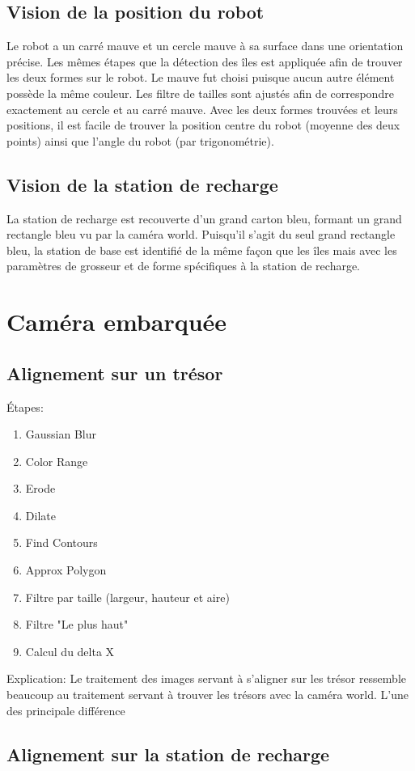 \subsection{Vision de la position du robot}

Le robot a un carré mauve et un cercle mauve à sa surface dans une orientation précise. Les mêmes étapes que la détection des îles est appliquée afin de trouver les deux formes sur le robot. Le mauve fut choisi puisque aucun autre élément possède la même couleur. Les filtre de tailles sont ajustés afin de correspondre exactement au cercle et au carré mauve. Avec les deux formes trouvées et leurs positions, il est facile de trouver la position centre du robot (moyenne des deux points) ainsi que l'angle du robot (par trigonométrie).


\subsection{Vision de la station de recharge}

La station de recharge est recouverte d'un grand carton bleu, formant un grand rectangle bleu vu par la caméra world. Puisqu'il s'agit du seul grand rectangle bleu, la station de base est identifié de la même façon que les îles mais avec les paramètres de grosseur et de forme spécifiques à la station de recharge.

\section{Caméra embarquée}

\subsection{Alignement sur un trésor}

Étapes:
\begin{enumerate}
\item Gaussian Blur
\item Color Range
\item Erode
\item Dilate
\item Find Contours
\item Approx Polygon
\item Filtre par taille (largeur, hauteur et aire)
\item Filtre "Le plus haut"
\item Calcul du delta X
\end{enumerate}

Explication: Le traitement des images servant à s'aligner sur les trésor ressemble beaucoup au traitement servant à trouver les trésors avec la caméra world.  L'une des principale différence

\subsection{Alignement sur la station de recharge}
